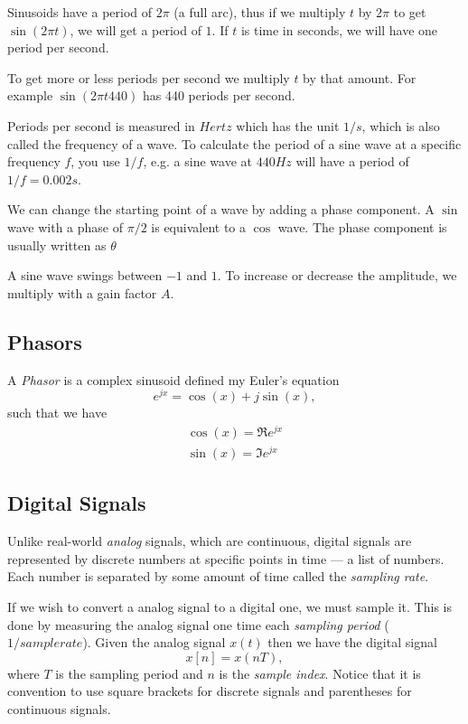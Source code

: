 \documentclass{article}
\def\lsqb{\left[}
\def\rsqb{\right]}
\def\sqb#1{\lsqb #1 \rsqb}
\def\xsig{x\sqb{n}}
\begin{document}
Sinusoids have a period of $2 \pi$ (a full arc), thus if we multiply $t$ by $2\pi$ to get $\sin(2 \pi t)$, we will get a period of $1$. If $t$ is time in seconds, we will have one period per second.

To get more or less periods per second we multiply $t$ by that amount. For example $\sin(2 \pi t 440)$ has 440 periods per second.

Periods per second is measured in $Hertz$ which has the unit $1/s$, which is also called the frequency of a wave. To calculate the period of a sine wave at a specific frequency $f$, you use $1/f$, e.g. a sine wave at $440Hz$ will have a period of $1/f=0.002s$.

We can change the starting point of a wave by adding a phase component. A $\sin$ wave with a phase of $\pi/2$ is equivalent to a $\cos$ wave. The phase component is usually written as $\theta$

A sine wave swings between $-1$ and $1$. To increase or decrease the amplitude, we multiply with a gain factor $A$.

\subsection{Phasors}
A \textit{Phasor} is a complex sinusoid defined my Euler's equation
\begin{equation}
    e^{jx} = \cos(x) + j\sin(x),
\end{equation}
such that we have
\begin{align}
    \cos(x) = \Re{e^{jx}}\\
    \sin(x) = \Im{e^{jx}}
\end{align}

\subsection{Digital Signals}
Unlike real-world \textit{analog} signals, which are continuous, digital signals are represented by discrete numbers at specific points in time --- a list of numbers. Each number is separated by some amount of time called the \textit{sampling rate}.

If we wish to convert a analog signal to a digital one, we must sample it. This is done by measuring the analog signal one time each \textit{sampling period} ($1/samplerate$). Given the analog signal $x(t)$ then we have the digital signal
\begin{equation}
    \xsig = x(nT),
\end{equation}
where $T$ is the sampling period and $n$ is the \textit{sample index}. Notice that it is convention to use square brackets for discrete signals and parentheses for continuous signals.
\end{document}
